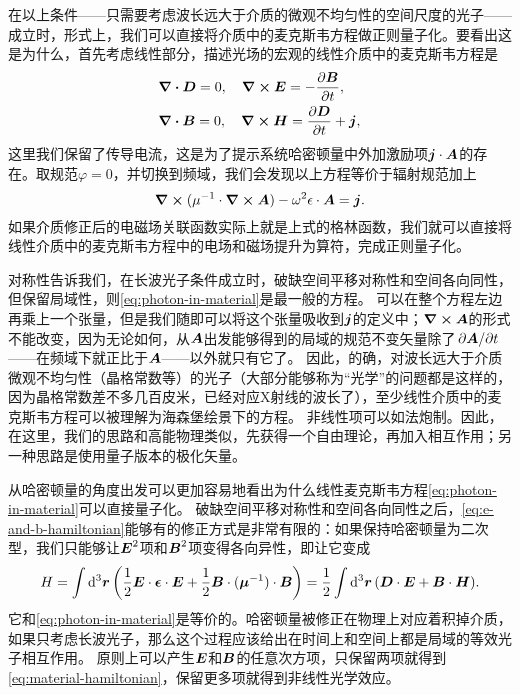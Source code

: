 在以上条件——只需要考虑波长远大于介质的微观不均匀性的空间尺度的光子——成立时，形式上，我们可以直接将介质中的麦克斯韦方程做正则量子化。要看出这是为什么，首先考虑线性部分，描述光场的宏观的线性介质中的麦克斯韦方程是
\[
    \begin{aligned}
        &\div{\vb*{D}} = 0, \quad \curl{\vb*{E}} = - \pdv{\vb*{B}}{t}, \\
        &\div{\vb*{B}} = 0, \quad \curl{\vb*{H}} = \pdv{\vb*{D}}{t} + \vb*{j},
    \end{aligned}
\]
这里我们保留了传导电流，这是为了提示系统哈密顿量中外加激励项$\vb*{j} \cdot \vb*{A}$的存在。取规范$\varphi=0$，并切换到频域，我们会发现以上方程等价于辐射规范加上
\begin{equation}
    \curl{(\mu^{-1} \cdot \curl{\vb*{A}})} - \omega^2 \epsilon \cdot \vb*{A} = \vb*{j}.
    \label{eq:photon-in-material}
\end{equation}
如果介质修正后的电磁场关联函数实际上就是上式的格林函数，我们就可以直接将线性介质中的麦克斯韦方程中的电场和磁场提升为算符，完成正则量子化。

对称性告诉我们，在长波光子条件成立时，破缺空间平移对称性和空间各向同性，但保留局域性，则\eqref{eq:photon-in-material}是最一般的方程。
可以在整个方程左边再乘上一个张量，但是我们随即可以将这个张量吸收到$\vb*{j}$的定义中；$\curl{\vb*{A}}$的形式不能改变，因为无论如何，从$\vb*{A}$出发能够得到的局域的规范不变矢量除了$\pdv*{\vb*{A}}{t}$——在频域下就正比于$\vb*{A}$——以外就只有它了。
因此，的确，对波长远大于介质微观不均匀性（晶格常数等）的光子（大部分能够称为“光学”的问题都是这样的，因为晶格常数差不多几百皮米，已经对应X射线的波长了），至少线性介质中的麦克斯韦方程可以被理解为海森堡绘景下的方程。
非线性项可以如法炮制。因此，在这里，我们的思路和高能物理类似，先获得一个自由理论，再加入相互作用；另一种思路是使用量子版本的极化矢量。

从哈密顿量的角度出发可以更加容易地看出为什么线性麦克斯韦方程\eqref{eq:photon-in-material}可以直接量子化。
破缺空间平移对称性和空间各向同性之后，\eqref{eq:e-and-b-hamiltonian}能够有的修正方式是非常有限的：如果保持哈密顿量为二次型，我们只能够让$\vb*{E}^2$项和$\vb*{B}^2$项变得各向异性，即让它变成
\begin{equation}
    H = \int \dd[3]{\vb*{r}} \left( \frac{1}{2} \vb*{E} \cdot \vb*{\epsilon} \cdot \vb*{E} + \frac{1}{2} \vb*{B} \cdot (\vb*{\mu}^{-1}) \cdot \vb*{B} \right) = \frac{1}{2} \int \dd[3]{\vb*{r}} (\vb*{D} \cdot \vb*{E} + \vb*{B} \cdot \vb*{H}).
    \label{eq:material-hamiltonian}
\end{equation}
它和\eqref{eq:photon-in-material}是等价的。哈密顿量被修正在物理上对应着积掉介质，如果只考虑长波光子，那么这个过程应该给出在时间上和空间上都是局域的等效光子相互作用。
原则上可以产生$\vb*{E}$和$\vb*{B}$的任意次方项，只保留两项就得到\eqref{eq:material-hamiltonian}，保留更多项就得到非线性光学效应。

